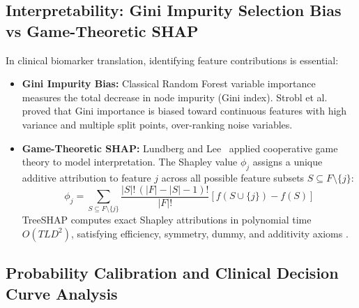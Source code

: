\documentclass[11pt,oneside]{book}
\begin{document}
\subsection{Interpretability: Gini Impurity Selection Bias vs Game-Theoretic SHAP}

In clinical biomarker translation, identifying feature contributions is essential:
\begin{itemize}
    \item \textbf{Gini Impurity Bias:} Classical Random Forest variable importance measures the total decrease in node impurity (Gini index). Strobl et al.~\cite{strobl2007bias} proved that Gini importance is biased toward continuous features with high variance and multiple split points, over-ranking noise variables.
    \item \textbf{Game-Theoretic SHAP:} Lundberg and Lee~\cite{lundberg2017unified} applied cooperative game theory to model interpretation. The Shapley value $\phi_j$ assigns a unique additive attribution to feature $j$ across all possible feature subsets $S \subseteq F \setminus \{j\}$:
    \begin{equation}
    \phi_j = \sum_{S \subseteq F \setminus \{j\}} \frac{|S|! \, (|F| - |S| - 1)!}{|F|!} \left[ f(S \cup \{j\}) - f(S) \right]
    \end{equation}
    TreeSHAP computes exact Shapley attributions in polynomial time $O(T L D^2)$, satisfying efficiency, symmetry, dummy, and additivity axioms \cite{lundberg2020local}.
\end{itemize}

\subsection{Probability Calibration and Clinical Decision Curve Analysis}
\end{document}
